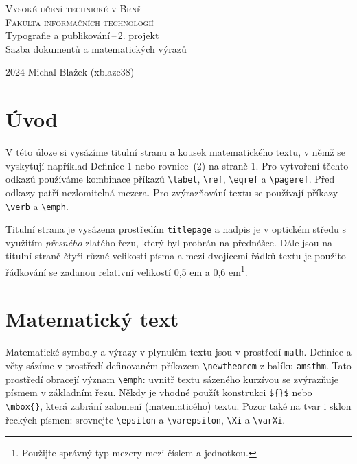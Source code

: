 \documentclass[a4paper, twocolumn, 11pt]{article}
\begin{document}
\begin{titlepage}
\begin{center}
    \Huge
    \textsc{Vysoké učení technické v Brně\\
    \huge{Fakulta informačních technologií}}\\
    \Large{Typografie a publikování\,--\,2. projekt\\
    Sazba dokumentů a matematických výrazů}\\
\end{center}
{\Large 2024 \hfill Michal Blažek (xblaze38)}
\end{titlepage}

\section*{Úvod}

V této úloze si vysázíme titulní stranu a kousek matematického textu, v němž se vyskytují například Definice 1 nebo rovnice~(2) na straně 1. Pro vytvoření těchto odkazů používáme kombinace příkazů \verb|\label|, \verb|\ref|, \verb|\eqref| a \verb|\pageref|. Před odkazy patří nezlomitelná mezera. Pro zvýrazňování textu se používají příkazy \verb|\verb| a \verb|\emph|.

Titulní strana je vysázena prostředím \texttt{titlepage} a nadpis je v optickém středu s využitím \emph{přesného} zlatého řezu, který byl probrán na přednášce. Dále jsou na titulní straně čtyři různé velikosti písma a mezi dvojicemi řádků textu je použito řádkování se zadanou relativní velikostí 0,5 em a 0,6 em\footnote{Použijte správný typ mezery mezi číslem a jednotkou.}.

\section{Matematický text}

Matematické symboly a výrazy v plynulém textu jsou v prostředí \texttt{math}. Definice a věty sázíme v prostředí definovaném příkazem \verb|\newtheorem| z balíku \texttt{amsthm}. Tato prostředí obracejí význam \verb|\emph|: uvnitř textu sázeného kurzívou se zvýrazňuje písmem v základním řezu. Někdy je vhodné použít konstrukci \verb|${}$| nebo \verb|\mbox{}|, která zabrání zalomení (matematicého) textu. Pozor také na tvar i sklon řeckých písmen: srovnejte \verb|\epsilon| a \verb|\varepsilon|, \verb|\Xi| a \verb|\varXi|.
\end{document}
